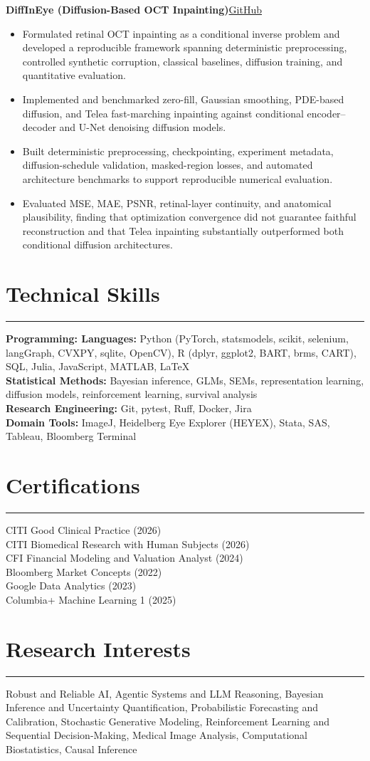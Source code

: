 \documentclass[11pt]{article}
\newcommand{\resheading}[1]{%
  \Needspace{6\baselineskip}%
  \section*{#1}\vspace{-4pt}\color{rulegray}\hrule\vspace{4pt}\color{black}
}
\newcommand{\projectentry}[2]{%
  \Needspace{8\baselineskip}%
  \textbf{#1}\hfill #2\\[-8pt]%
}
\newenvironment{tightitemize}{%
  \vspace{-2pt}%
  \begin{itemize}[leftmargin=*,topsep=0pt,itemsep=1pt,parsep=0pt,partopsep=0pt]
}{%
  \end{itemize}\vspace{4pt}
}
\begin{document}
\projectentry
{DiffInEye (Diffusion-Based OCT Inpainting)}
{\href{https://github.com/JonathanMa03/diff-in-eye}{GitHub}}
\begin{tightitemize}
\item Formulated retinal OCT inpainting as a conditional inverse problem and developed a reproducible framework spanning deterministic preprocessing, controlled synthetic corruption, classical baselines, diffusion training, and quantitative evaluation.
\item Implemented and benchmarked zero-fill, Gaussian smoothing, PDE-based diffusion, and Telea fast-marching inpainting against conditional encoder--decoder and U-Net denoising diffusion models.
\item Built deterministic preprocessing, checkpointing, experiment metadata, diffusion-schedule validation, masked-region losses, and automated architecture benchmarks to support reproducible numerical evaluation.
\item Evaluated MSE, MAE, PSNR, retinal-layer continuity, and anatomical plausibility, finding that optimization convergence did not guarantee faithful reconstruction and that Telea inpainting substantially outperformed both conditional diffusion architectures.
\end{tightitemize}


\resheading{Technical Skills}

\textbf{Programming: Languages:} Python (PyTorch, statsmodels, scikit, selenium, langGraph, CVXPY, sqlite, OpenCV), R (dplyr, ggplot2, BART, brms, CART), SQL, Julia, JavaScript, MATLAB, LaTeX \\
\textbf{Statistical Methods:} Bayesian inference, GLMs, SEMs, representation learning, diffusion models, reinforcement learning, survival analysis \\
\textbf{Research Engineering:} Git, pytest, Ruff, Docker, Jira \\
\textbf{Domain Tools:} ImageJ, Heidelberg Eye Explorer (HEYEX), Stata, SAS, Tableau, Bloomberg Terminal

\resheading{Certifications}

CITI Good Clinical Practice (2026) \\
CITI Biomedical Research with Human Subjects (2026) \\
CFI Financial Modeling and Valuation Analyst (2024) \\
Bloomberg Market Concepts (2022) \\
Google Data Analytics (2023) \\
Columbia+ Machine Learning 1 (2025) 

\resheading{Research Interests}

Robust and Reliable AI, Agentic Systems and LLM Reasoning, Bayesian Inference and Uncertainty Quantification, Probabilistic Forecasting and Calibration, Stochastic Generative Modeling, Reinforcement Learning and Sequential Decision-Making, Medical Image Analysis, Computational Biostatistics, Causal Inference
\end{document}
